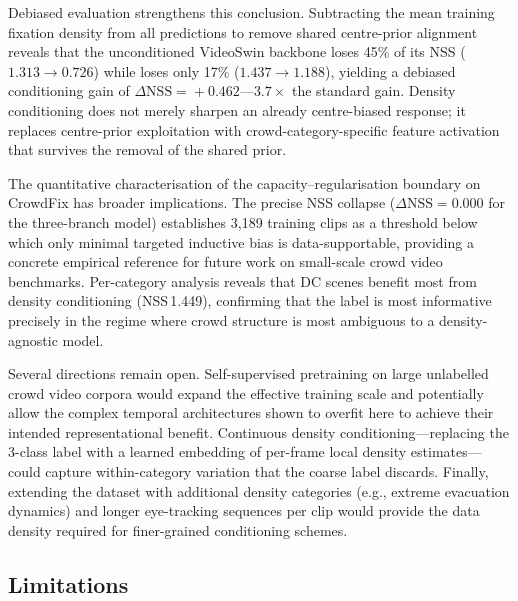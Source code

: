 \documentclass[twocolumn]{article}
\begin{document}
Debiased evaluation strengthens this conclusion.  Subtracting the mean
training fixation density from all predictions to remove shared centre-prior
alignment reveals that the unconditioned VideoSwin backbone loses 45\% of
its NSS ($1.313\to0.726$) while \ourmodel{} loses only 17\%
($1.437\to1.188$), yielding a debiased conditioning gain of
$\Delta\mathrm{NSS}\!=\!+0.462$---$3.7\!\times$ the standard gain.
Density conditioning does not merely sharpen an already centre-biased
response; it replaces centre-prior exploitation with crowd-category-specific
feature activation that survives the removal of the shared prior.

The quantitative characterisation of the capacity--regularisation boundary
on CrowdFix has broader implications.  The precise NSS collapse
($\Delta\mathrm{NSS}\!=\!0.000$ for the three-branch model) establishes
3,189 training clips as a threshold below which only minimal targeted
inductive bias is data-supportable, providing a concrete empirical reference
for future work on small-scale crowd video benchmarks.  Per-category
analysis reveals that DC scenes benefit most from density conditioning
(NSS\,1.449), confirming that the label is most informative precisely in
the regime where crowd structure is most ambiguous to a
density-agnostic model.

Several directions remain open.  Self-supervised pretraining on large
unlabelled crowd video corpora would expand the effective training scale and
potentially allow the complex temporal architectures shown to overfit here
to achieve their intended representational benefit.  Continuous density
conditioning---replacing the 3-class label with a learned embedding of
per-frame local density estimates---could capture within-category variation
that the coarse label discards.  Finally, extending the dataset with
additional density categories (e.g., extreme evacuation dynamics) and
longer eye-tracking sequences per clip would provide the data density
required for finer-grained conditioning schemes.

\subsection*{Limitations}
\end{document}
